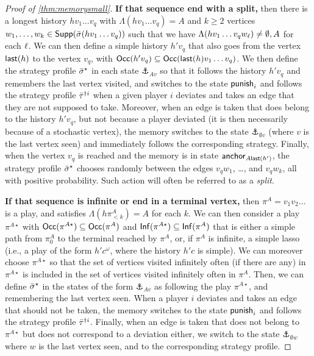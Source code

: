 \begin{proof}[Proof of \cref{thm:memorysmall}]
    \textbf{If that sequence end with a split,} then there is a longest history $hv_1 \dots v_q$ with $\Lambda(hv_1 \dots v_q) = A$ and $k \geq 2$ vertices $w_1, \dots, w_k \in \mathsf{Supp}({\bar{\sigma}}(hv_1 \dots v_q))$ such that we have $\Lambda(hv_1 \dots v_q w_\ell) \neq \emptyset, A$ for each $\ell$.
    We can then define a simple history $h'v_q$ that also goes from the vertex $\mathsf{last}(h)$ to the vertex $v_q$, with $\mathsf{Occ}(h'v_q) \subseteq \mathsf{Occ}(\mathsf{last}(h) v_1 \dots v_q)$.
    We then define the strategy profile ${\bar{\sigma}}^\star$ in each state $\anchor_{Av}$ so that it follows the history $h' v_q$ and remembers the last vertex visited, and switches to the state $\mathsf{punish}_i$ and follows the strategy profile ${\bar{\tau}}^{\dag i}$ when a given player $i$ deviates and takes an edge that they are not supposed to take.
    Moreover, when an edge is taken that does belong to the history $h'v_q$, but not because a player deviated (it is then necessarily because of a stochastic vertex), the memory switches to the state $\anchor_{\emptyset v}$ (where $v$ is the last vertex seen) and immediately follows the corresponding strategy.
    Finally, when the vertex $v_q$ is reached and the memory is in state $\mathsf{anchor}_{A \mathsf{last}(h')}$, the strategy profile ${\bar{\sigma}}^\star$ chooses randomly between the edges $v_q w_1$, \dots, and $v_q w_k$, all with positive probability.
    Such action will often be referred to as a \emph{split}.


        \textbf{If that sequence is infinite or end in a terminal vertex,} then $\pi^A = v_1 v_2 \dots$ is a play, and satisfies $\Lambda(h\pi^A_{< k}) = A$ for each $k$.
        We can then consider a play $\pi^{A\star}$ with $\mathsf{Occ}(\pi^{A\star}) \subseteq \mathsf{Occ}(\pi^A)$ and $\mathsf{Inf}(\pi^{A\star}) \subseteq \mathsf{Inf}(\pi^A)$ that is either a simple path from $\pi^A_0$ to the terminal reached by $\pi^A$, or, if $\pi^A$ is infinite, a simple lasso (i.e., a play of the form $h'c^\omega$, where the history $h'c$ is simple).
        We can moreover choose $\pi^{A\star}$ so that the set of vertices visited infinitely often (if there are any) in $\pi^{A\star}$ is included in the set of vertices visited infinitely often in $\pi^A$.
Then, we can define ${\bar{\sigma}}^\star$ in the states of the form $\anchor_{A v}$ as following the play $\pi^{A\star}$, and remembering the last vertex seen.
    When a player $i$ deviates and takes an edge that should not be taken, the memory switches to the state $\mathsf{punish}_i$ and follows the strategy profile ${\bar{\tau}}^{\dag i}$.
    Finally, when an edge is taken that does not belong to $\pi^{A\star}$ but does not correspond to a deviation either, we switch to the state $\anchor_{\emptyset w}$ where $w$ is the last vertex seen, and to the corresponding strategy profile.




\end{proof}
